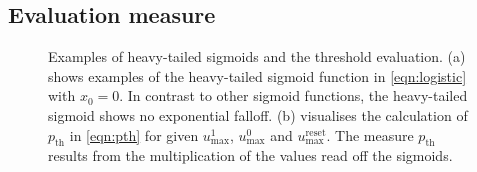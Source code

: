 \subsection{Evaluation measure}
\begin{figure}
	\small
	\centering
	\caption[Examples of heavy-tailed sigmoids and the threshold evaluation]{Examples of heavy-tailed sigmoids and the threshold evaluation. (a) shows examples of the heavy-tailed sigmoid function in \cref{eqn:logistic} with $x_0 = 0$. In contrast to other sigmoid functions, the heavy-tailed sigmoid shows no exponential falloff. (b) visualises the calculation of $p_\mathrm{th}$ in \cref{eqn:pth} for given $u_\mathrm{max}^{1}$, $u_\mathrm{max}^{0}$ and $u_\mathrm{max}^\mathrm{reset}$. The measure $p_\mathrm{th}$ results from the multiplication of the values read off the sigmoids.}
\end{figure}
